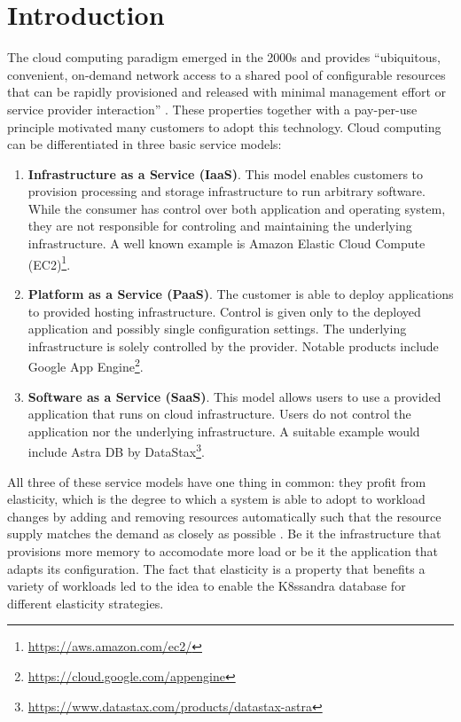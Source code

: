 \chapter{Introduction}
\label{ch:introduction}

The cloud computing paradigm emerged in the 2000s and provides ``ubiquitous, convenient, on-demand network access to a shared pool of configurable resources that can be rapidly provisioned and released with minimal management effort or service provider interaction'' \cite{mellNISTDefinitionCloud2011a}. These properties together with a pay-per-use principle motivated many customers to adopt this technology. Cloud computing can be differentiated in three basic service models:

\begin{enumerate}
    \item \textbf{Infrastructure as a Service (IaaS)}. This model enables customers to provision processing and storage infrastructure to run arbitrary software. While the consumer has control over both application and operating system, they are not responsible for controling and maintaining the underlying infrastructure. A well known example is Amazon Elastic Cloud Compute (EC2)\footnote{\url{https://aws.amazon.com/ec2/}}.

    \item \textbf{Platform as a Service (PaaS)}. The customer is able to deploy applications to provided hosting infrastructure. Control is given only to the deployed application and possibly single configuration settings. The underlying infrastructure is solely controlled by the provider. Notable products include Google App Engine\footnote{\url{https://cloud.google.com/appengine}}.

    \item \textbf{Software as a Service (SaaS)}. This model allows users to use a provided application that runs on cloud infrastructure. Users do not control the application nor the underlying infrastructure. A suitable example would include Astra DB by DataStax\footnote{\url{https://www.datastax.com/products/datastax-astra}}.
\end{enumerate}

All three of these service models have one thing in common: they profit from elasticity, which is the degree to which a system is able to adopt to workload changes by adding and removing resources automatically such that the resource supply matches the demand as closely as possible \cite{herbstElasticityCloudComputing2013}. Be it the infrastructure that provisions more memory to accomodate more load or be it the application that adapts its configuration. The fact that elasticity is a property that benefits a variety of workloads led to the idea to enable the K8ssandra database for different elasticity strategies.

